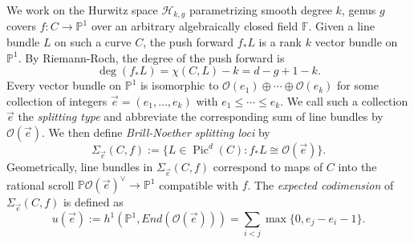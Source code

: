 \documentclass[12pt]{amsart}
\newcommand{\cc}{\mathbb{F}}
\newcommand{\pp}{\mathbb{P}}
\renewcommand{\H}{\mathcal{H}}
\renewcommand{\O}{\mathscr{O}}
\DeclareMathOperator{\Pic}{Pic}
\theoremstyle{definition}
\theoremstyle{remark}
\theoremstyle{remark}
\numberwithin{equation}{section}
\begin{document}
We work on the Hurwitz space $\H_{k,g}$ parametrizing smooth degree $k$, genus $g$ covers $f\colon  C \rightarrow \pp^1$ over an arbitrary algebraically closed field $\cc$.
Given a line bundle $L$ on such a curve $C$, the push forward $f_* L$ is a rank $k$ vector bundle on $\pp^1$. 
By Riemann-Roch, the degree of the push forward is
\begin{equation} \label{rr}
\deg(f_*L) = \chi(C, L) - k = d - g + 1 - k.
\end{equation}
Every vector bundle on $\pp^1$ is isomorphic to $\O(e_1) \oplus \cdots \oplus \O(e_k)$ for some collection of integers $\vec{e} = (e_1, \ldots, e_k)$ with $e_1 \leq \cdots \leq e_k$.
We call such a collection $\vec{e}$ the \textit{splitting type} and abbreviate the corresponding sum of line bundles by $\O(\vec{e})$.
We then define \textit{Brill-Noether splitting loci} by
\[\Sigma_{\vec{e}}(C, f) := \{L \in \Pic^d(C) : f_*L \cong \O(\vec{e})\}. \]
Geometrically, line bundles in $\Sigma_{\vec{e}}(C, f)$ correspond to maps of $C$ into the rational scroll $\pp \O(\vec{e})^\vee \rightarrow \pp^1$ compatible with $f$.
The \textit{expected codimension} of $\Sigma_{\vec{e}}(C, f)$ is defined as
\[u(\vec{e}) := h^1(\pp^1, End(\O(\vec{e}))) = \sum_{i < j} \max \{0, e_j - e_i - 1\}.\]
\end{document}
